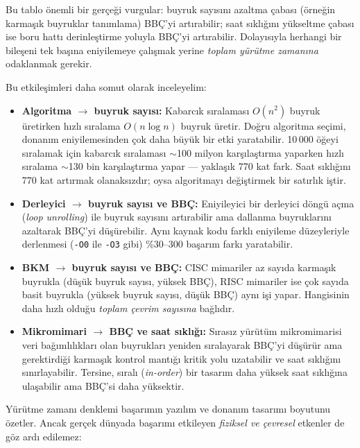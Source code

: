 \noindent Bu tablo önemli bir gerçeği vurgular: buyruk sayısını azaltma çabası (örneğin karmaşık buyruklar tanımlama) BBÇ'yi artırabilir; saat sıklığını yükseltme çabası ise boru hattı derinleştirme yoluyla BBÇ'yi artırabilir. Dolayısıyla herhangi bir bileşeni tek başına eniyilemeye çalışmak yerine \emph{toplam yürütme zamanına} odaklanmak gerekir.

Bu etkileşimleri daha somut olarak inceleyelim:
\begin{itemize}
    \item \textbf{Algoritma $\rightarrow$ buyruk sayısı:} Kabarcık sıralaması $O(n^2)$ buyruk üretirken hızlı sıralama $O(n \log n)$ buyruk üretir. Doğru algoritma seçimi, donanım eniyilemesinden çok daha büyük bir etki yaratabilir. 10\,000 öğeyi sıralamak için kabarcık sıralaması $\sim$100 milyon karşılaştırma yaparken hızlı sıralama $\sim$130 bin karşılaştırma yapar --- yaklaşık 770 kat fark. Saat sıklığını 770 kat artırmak olanaksızdır; oysa algoritmayı değiştirmek bir satırlık iştir.

    \item \textbf{Derleyici $\rightarrow$ buyruk sayısı ve BBÇ:} Eniyileyici bir derleyici döngü açma (\emph{loop unrolling}) ile buyruk sayısını artırabilir ama dallanma buyruklarını azaltarak BBÇ'yi düşürebilir. Aynı kaynak kodu farklı eniyileme düzeyleriyle derlenmesi (\texttt{-O0} ile \texttt{-O3} gibi) \%30--300 başarım farkı yaratabilir.

    \item \textbf{BKM $\rightarrow$ buyruk sayısı ve BBÇ:} CISC mimariler az sayıda karmaşık buyrukla (düşük buyruk sayısı, yüksek BBÇ), RISC mimariler ise çok sayıda basit buyrukla (yüksek buyruk sayısı, düşük BBÇ) aynı işi yapar. Hangisinin daha hızlı olduğu \emph{toplam çevrim sayısına} bağlıdır.

    \item \textbf{Mikromimari $\rightarrow$ BBÇ ve saat sıklığı:} Sırasız yürütüm mikromimarisi veri bağımlılıkları olan buyrukları yeniden sıralayarak BBÇ'yi düşürür ama gerektirdiği karmaşık kontrol mantığı kritik yolu uzatabilir ve saat sıklığını sınırlayabilir. Tersine, sıralı (\emph{in-order}) bir tasarım daha yüksek saat sıklığına ulaşabilir ama BBÇ'si daha yüksektir.
\end{itemize}

Yürütme zamanı denklemi başarımın yazılım ve donanım tasarımı boyutunu özetler. Ancak gerçek dünyada başarımı etkileyen \emph{fiziksel ve çevresel} etkenler de göz ardı edilemez:


